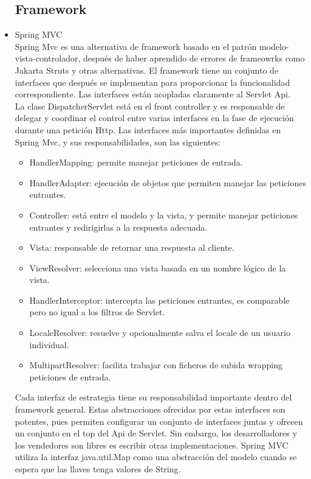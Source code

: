 \begin{itemize}
			\subsection{Framework}
			\item Spring MVC \\ 
			Spring Mvc es una alternativa de framework basado en el patrón modelo-vista-controlador, después de haber aprendido de errores de frameowrks como Jakarta Struts y otras alternativas.
			El framework tiene un conjunto de interfaces que después se implementan para proporcionar la funcionalidad correspondiente. Las interfaces están acopladas claramente al Servlet Api.\cite{spring}\\
			La clase DispatcherServlet está en el front controller y es responsable de delegar y coordinar el control entre varias interfaces en la fase de ejecución durante una petición Http.
			Las interfaces más importantes definidas en Spring Mvc, y sus responsabilidades, son las siguientes:
			\begin{itemize}
				\item HandlerMapping: permite manejar peticiones de entrada.
				\item HandlerAdapter: ejecución de objetos que permiten manejar las peticiones entrantes.
				\item Controller: está entre el modelo y la vista, y permite manejar peticiones entrantes y redirigirlas a la respuesta adecuada. 
				\item Vista: responsable de retornar una respuesta al cliente. 
				\item ViewResolver: selecciona una vista basada en un nombre lógico de la vista.
				\item HandlerInterceptor: intercepta las peticiones entrantes, es comparable pero no igual a los filtros de Servlet.
				\item LocaleResolver: resuelve y opcionalmente salva el locale de un usuario individual.
				\item MultipartResolver: facilita trabajar con ficheros de subida wrapping peticiones de entrada.
			\end{itemize}
			Cada interfaz de estrategia tiene su responsabilidad importante dentro del framework general. Estas abstracciones ofrecidas por estas interfaces son potentes, pues permiten configurar un conjunto de interfaces juntas y ofrecen un conjunto en el top del Api de Servlet. Sin embargo, los desarrolladores y los vendedores son libres es escribir otras implementaciones. Spring MVC utiliza la interfaz java.util.Map como una abstracción del modelo cuando se espera que las llaves tenga valores de String. \\

\end{itemize}
